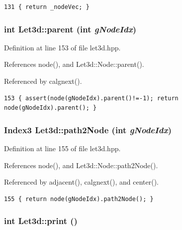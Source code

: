 \footnotesize\begin{verbatim}131 { return _nodeVec; }
\end{verbatim}\normalsize 


\subsubsection{\setlength{\rightskip}{0pt plus 5cm}int Let3d::parent (int {\em g\-Node\-Idx})\hspace{0.3cm}{\tt  [inline]}}\label{classLet3d_eedcae6652a6a95ae0ef366d7e8ad0ef_eedcae6652a6a95ae0ef366d7e8ad0ef}




Definition at line 153 of file let3d.hpp.

References node(), and Let3d::Node::parent().

Referenced by calgnext().

\footnotesize\begin{verbatim}153 { assert(node(gNodeIdx).parent()!=-1); return node(gNodeIdx).parent(); }
\end{verbatim}\normalsize 


\subsubsection{\setlength{\rightskip}{0pt plus 5cm}Index3 Let3d::path2Node (int {\em g\-Node\-Idx})\hspace{0.3cm}{\tt  [inline]}}\label{classLet3d_8df44bec9d337d228d001b12e5e6379e_8df44bec9d337d228d001b12e5e6379e}




Definition at line 155 of file let3d.hpp.

References node(), and Let3d::Node::path2Node().

Referenced by adjacent(), calgnext(), and center().

\footnotesize\begin{verbatim}155 { return node(gNodeIdx).path2Node(); }
\end{verbatim}\normalsize 


\subsubsection{\setlength{\rightskip}{0pt plus 5cm}int Let3d::print ()}\label{classLet3d_d0d33c63402dfb2c02713a7fd52578c1_d0d33c63402dfb2c02713a7fd52578c1}




